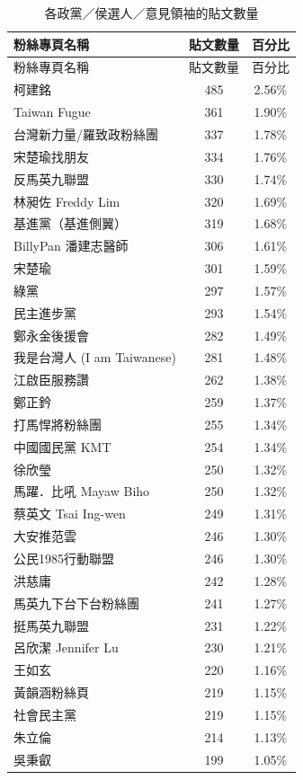 \documentclass[letterpaper, 10pt, conference]{ieeeconf}   %
\begin{document}
\begin{CJK}{UTF8}{bsmi}
\begin{longtable}[c]{@{}lcc@{}}
\caption{各政黨／侯選人／意見領袖的貼文數量}
\label{t1}\\
\toprule
粉絲專頁名稱 & 貼文數量 & 百分比 \\* \midrule
\endfirsthead
\toprule
粉絲專頁名稱 & 貼文數量 & 百分比 \\* \midrule
\endhead
%
\bottomrule
\endfoot
%
\endlastfoot
%
柯建銘 & 485 & 2.56\% \\
Taiwan Fugue & 361 & 1.90\% \\
台灣新力量/羅致政粉絲團 & 337 & 1.78\% \\
宋楚瑜找朋友 & 334 & 1.76\% \\
反馬英九聯盟 & 330 & 1.74\% \\
林昶佐 Freddy Lim & 320 & 1.69\% \\
基進黨（基進側翼） & 319 & 1.68\% \\
BillyPan 潘建志醫師 & 306 & 1.61\% \\
宋楚瑜 & 301 & 1.59\% \\
綠黨 & 297 & 1.57\% \\
民主進步黨 & 293 & 1.54\% \\
鄭永金後援會 & 282 & 1.49\% \\
我是台灣人 (I am Taiwanese) & 281 & 1.48\% \\
江啟臣服務讚 & 262 & 1.38\% \\
鄭正鈐 & 259 & 1.37\% \\
打馬悍將粉絲團 & 255 & 1.34\% \\
中國國民黨 KMT & 254 & 1.34\% \\
徐欣瑩 & 250 & 1.32\% \\
馬躍．比吼 Mayaw Biho & 250 & 1.32\% \\
蔡英文 Tsai Ing-wen & 249 & 1.31\% \\
大安推范雲 & 246 & 1.30\% \\
公民1985行動聯盟 & 246 & 1.30\% \\
洪慈庸 & 242 & 1.28\% \\
馬英九下台下台粉絲團 & 241 & 1.27\% \\
挺馬英九聯盟 & 231 & 1.22\% \\
呂欣潔 Jennifer Lu & 230 & 1.21\% \\
王如玄 & 220 & 1.16\% \\
黃韻涵粉絲頁 & 219 & 1.15\% \\
社會民主黨 & 219 & 1.15\% \\
朱立倫 & 214 & 1.13\% \\
吳秉叡 & 199 & 1.05\% \\

\end{longtable}
\end{CJK}
\end{document}
